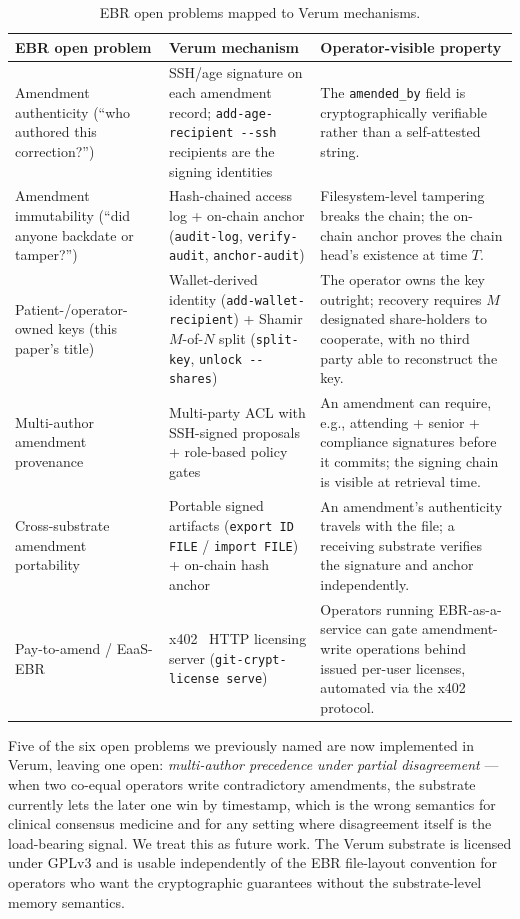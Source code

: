 \documentclass[11pt,a4paper]{article}
\begin{document}
\begin{table}[h]
\centering
\caption{EBR open problems mapped to Verum mechanisms.}
\label{tab:ebr-verum}
\small
\renewcommand{\arraystretch}{1.15}
\begin{tabular}{p{}p{}p{}}
\toprule
\textbf{EBR open problem} & \textbf{Verum mechanism} & \textbf{Operator-visible property} \\
\midrule
Amendment authenticity (``who authored this correction?'') &
SSH/age signature on each amendment record; \texttt{add-age-recipient -{}-ssh} recipients are the signing identities &
The \texttt{amended\_by} field is cryptographically verifiable rather than a self-attested string. \\
\midrule
Amendment immutability (``did anyone backdate or tamper?'') &
Hash-chained access log + on-chain anchor (\texttt{audit-log}, \texttt{verify-audit}, \texttt{anchor-audit}) &
Filesystem-level tampering breaks the chain; the on-chain anchor proves the chain head's existence at time $T$. \\
\midrule
Patient-/operator-owned keys (this paper's title) &
Wallet-derived identity (\texttt{add-wallet-recipient}) + Shamir $M$-of-$N$ split (\texttt{split-key}, \texttt{unlock -{}-shares}) &
The operator owns the key outright; recovery requires $M$ designated share-holders to cooperate, with no third party able to reconstruct the key. \\
\midrule
Multi-author amendment provenance &
Multi-party {ACL} with SSH-signed proposals + role-based policy gates &
An amendment can require, e.g., attending + senior + compliance signatures before it commits; the signing chain is visible at retrieval time. \\
\midrule
Cross-substrate amendment portability &
Portable signed artifacts (\texttt{export ID FILE} / \texttt{import FILE}) + on-chain hash anchor &
An amendment's authenticity travels with the file; a receiving substrate verifies the signature and anchor independently. \\
\midrule
Pay-to-amend / EaaS-EBR &
{x402}~\cite{x402spec} HTTP licensing server (\texttt{git-crypt-license serve}) &
Operators running EBR-as-a-service can gate amendment-write operations behind issued per-user licenses, automated via the {x402} protocol. \\
\bottomrule
\end{tabular}
\end{table}

Five of the six open problems we previously named are now implemented in
Verum, leaving one open: \emph{multi-author precedence under partial
disagreement} --- when two co-equal operators write contradictory
amendments, the substrate currently lets the later one win by timestamp,
which is the wrong semantics for clinical consensus medicine and for any
setting where disagreement itself is the load-bearing signal. We treat
this as future work. The Verum substrate is licensed under GPLv3 and is
usable independently of the EBR file-layout convention for operators who
want the cryptographic guarantees without the substrate-level memory
semantics.
\end{document}
